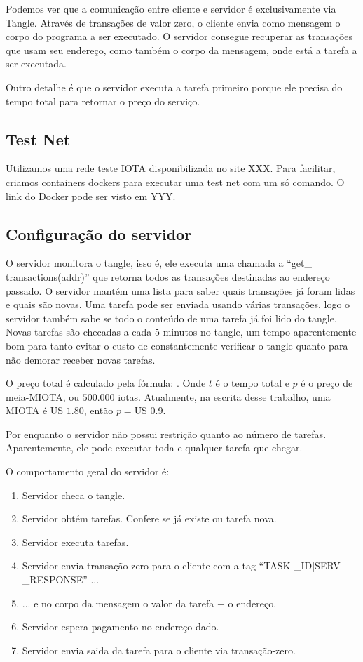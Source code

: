 \documentclass[a4paper]{article}
\begin{document}
Podemos ver que a comunicação entre cliente e servidor é exclusivamente via Tangle. Através de transações de valor zero, o cliente
envia como mensagem o corpo do programa a ser executado. O servidor consegue recuperar as transações que usam seu endereço, como
também o corpo da mensagem, onde está a tarefa a ser executada.

Outro detalhe é que o servidor executa a tarefa primeiro porque ele precisa do tempo total para retornar o preço do serviço.

\subsection{Test Net}

Utilizamos uma rede teste IOTA disponibilizada no site XXX. Para facilitar, criamos containers dockers para executar uma test
net com um só comando. O link do Docker pode ser visto em YYY.

\subsection{Configuração do servidor}

O servidor monitora o tangle, isso é, ele executa uma chamada a ``get\_ transactions(addr)'' que retorna todos as transações destinadas
ao endereço passado. O servidor mantém uma lista para saber quais transações já foram lidas e quais são novas. Uma tarefa pode ser enviada
usando várias transações, logo o servidor também sabe se todo o conteúdo de uma tarefa já foi lido do tangle. Novas tarefas são checadas a cada
5 minutos no tangle, um tempo aparentemente bom para tanto evitar o custo de constantemente verificar o tangle quanto para não demorar receber novas tarefas.

O preço total é calculado pela fórmula: . Onde $t$ é o tempo total e $p$ é o preço de meia-MIOTA, ou $500.000$ iotas.
Atualmente, na escrita desse trabalho, uma MIOTA é $\text{US }1.80$, então $p = \text{US }0.9$.

Por enquanto o servidor não possui restrição quanto ao número de tarefas. Aparentemente, ele pode executar toda e qualquer tarefa que chegar.

O comportamento geral do servidor é:

\begin{enumerate}
\item Servidor checa o tangle.
\item Servidor obtém tarefas. Confere se já existe ou tarefa nova.
\item Servidor executa tarefas.
\item Servidor envia transação-zero para o cliente com a tag ``TASK \_ID|SERV \_RESPONSE'' ...
\item ... e no corpo da mensagem o valor da tarefa + o endereço.
\item Servidor espera pagamento no endereço dado.
\item Servidor envia saida da tarefa para o cliente via transação-zero.
\end{enumerate}
\end{document}
